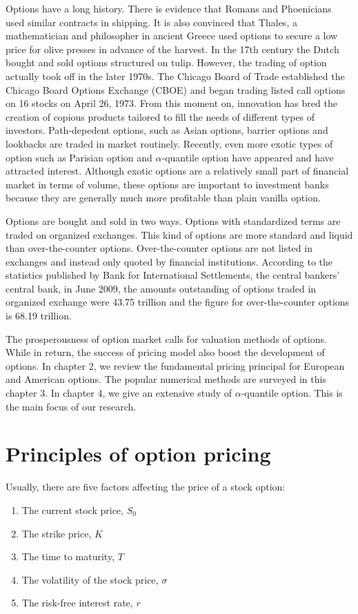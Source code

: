 \documentclass[11pt]{book}
\begin{document}
Options have a long history. There is evidence that Romans and Phoenicians used similar contracts in shipping.  It is also convinced that Thales, a mathematician and philosopher in ancient Greece used options to secure a low price for olive presses in advance of the harvest. In the 17th century the Dutch bought and sold options structured on tulip. However, the trading of option actually took off in the later 1970s. The Chicago Board of Trade established the Chicago Board Options Exchange (CBOE) and began trading listed call options on 16 stocks on April 26, 1973.
From this moment on, innovation has bred the creation of copious products tailored to fill the needs of different types of investors. Path-depedent options, such as Asian options, barrier options and lookbacks are traded in market routinely.
Recently, even more exotic types of option such as Parisian option and ${\alpha}$-quantile option have appeared and have attracted interest. Although exotic options are a relatively small part of financial market in terms of volume, these options are important to investment banks because they are generally much more profitable than plain vanilla option.

Options are bought and sold in two ways. Options with standardized terms are traded on organized exchanges. This kind of options are more standard and liquid than over-the-counter options. Over-the-counter options are not listed in exchanges and instead only quoted by financial institutions. According to the statistics published by Bank for International Settlements, the central bankers' central bank, in June 2009, the amounts outstanding of options traded in organized exchange were 43.75 trillion and the figure for over-the-counter options is 68.19 trillion.

The prosperousness of option market calls for valuation methods of options. While in return, the success of pricing model also boost the development of options. In chapter 2, we review the fundamental pricing principal for European and American options. The popular numerical methods are surveyed in this chapter 3. In chapter 4, we give an extensive study of $\alpha$-quantile option. This is the main focus of our research.

\chapter{Principles of option pricing}

Usually, there are five factors affecting the price of a stock option:
\begin{enumerate}[1.]
\item The current stock price, $S_0$
\item The strike price, $K$
\item The time to maturity, $T$
\item The volatility of the stock price, $\sigma$
\item The risk-free interest rate, $r$
\end{enumerate}
\end{document}
